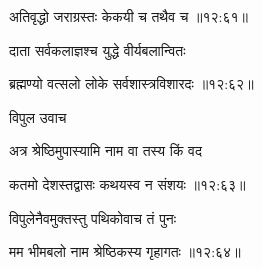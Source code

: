 
{\devanagarifont अतिवृद्धो जराग्रस्तः केकयी च तथैव च {॥१२:६१॥} \veg\dontdisplaylinenum }%

{\devanagarifont दाता सर्वकलाज्ञश्च युद्धे वीर्यबलान्वितः \thinspace{\dandab} \dontdisplaylinenum }%


{\devanagarifont ब्रह्मण्यो वत्सलो लोके सर्वशास्त्रविशारदः {॥१२:६२॥} \veg\dontdisplaylinenum }%
 
{\devanagarifont विपुल उवाच {\dandab}\dontdisplaylinenum  }%
 
{\devanagarifont अत्र श्रेष्ठिमुपास्यामि नाम वा तस्य किं वद \thinspace{\danda} \dontdisplaylinenum }%


{\devanagarifont कतमो देशस्तद्वासः कथयस्व न संशयः {॥१२:६३॥} \veg\dontdisplaylinenum }%

{\devanagarifont विपुलेनैवमुक्तस्तु पथिकोवाच तं पुनः \thinspace{\dandab} \dontdisplaylinenum }%


{\devanagarifont मम भीमबलो नाम श्रेष्ठिकस्य गृहागतः {॥१२:६४॥} \veg\dontdisplaylinenum }%

